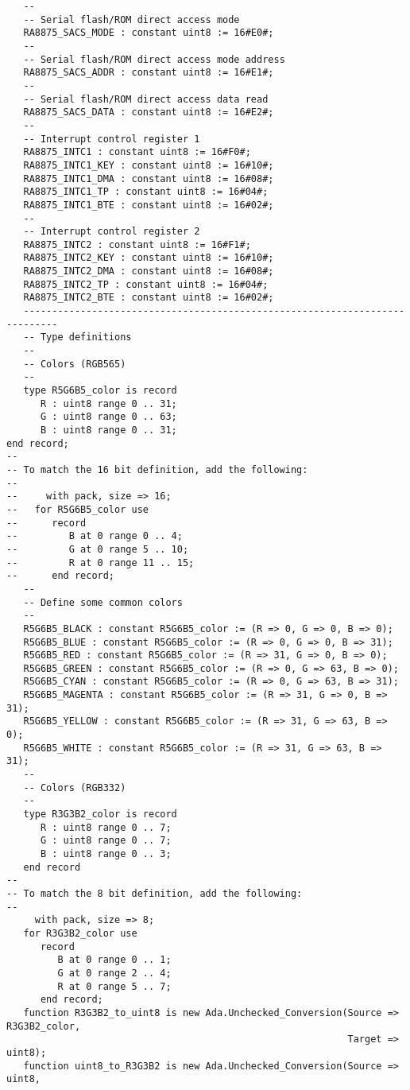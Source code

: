\documentclass[10pt, openany]{book}
\begin{document}
\begin{lstlisting}
   --
   -- Serial flash/ROM direct access mode
   RA8875_SACS_MODE : constant uint8 := 16#E0#;
   --
   -- Serial flash/ROM direct access mode address
   RA8875_SACS_ADDR : constant uint8 := 16#E1#;
   --
   -- Serial flash/ROM direct access data read
   RA8875_SACS_DATA : constant uint8 := 16#E2#;
   --
   -- Interrupt control register 1
   RA8875_INTC1 : constant uint8 := 16#F0#;
   RA8875_INTC1_KEY : constant uint8 := 16#10#;
   RA8875_INTC1_DMA : constant uint8 := 16#08#;
   RA8875_INTC1_TP : constant uint8 := 16#04#;
   RA8875_INTC1_BTE : constant uint8 := 16#02#;
   --
   -- Interrupt control register 2
   RA8875_INTC2 : constant uint8 := 16#F1#;
   RA8875_INTC2_KEY : constant uint8 := 16#10#;
   RA8875_INTC2_DMA : constant uint8 := 16#08#;
   RA8875_INTC2_TP : constant uint8 := 16#04#;
   RA8875_INTC2_BTE : constant uint8 := 16#02#;
   ----------------------------------------------------------------------------
   -- Type definitions
   --
   -- Colors (RGB565)
   --
   type R5G6B5_color is record
      R : uint8 range 0 .. 31;
      G : uint8 range 0 .. 63;
      B : uint8 range 0 .. 31;
end record;
--
-- To match the 16 bit definition, add the following:
--
--     with pack, size => 16;
--   for R5G6B5_color use
--      record
--         B at 0 range 0 .. 4;
--         G at 0 range 5 .. 10;
--         R at 0 range 11 .. 15;
--      end record;
   --
   -- Define some common colors
   --
   R5G6B5_BLACK : constant R5G6B5_color := (R => 0, G => 0, B => 0);
   R5G6B5_BLUE : constant R5G6B5_color := (R => 0, G => 0, B => 31);
   R5G6B5_RED : constant R5G6B5_color := (R => 31, G => 0, B => 0);
   R5G6B5_GREEN : constant R5G6B5_color := (R => 0, G => 63, B => 0);
   R5G6B5_CYAN : constant R5G6B5_color := (R => 0, G => 63, B => 31);
   R5G6B5_MAGENTA : constant R5G6B5_color := (R => 31, G => 0, B => 31);
   R5G6B5_YELLOW : constant R5G6B5_color := (R => 31, G => 63, B => 0);
   R5G6B5_WHITE : constant R5G6B5_color := (R => 31, G => 63, B => 31);
   --
   -- Colors (RGB332)
   --
   type R3G3B2_color is record
      R : uint8 range 0 .. 7;
      G : uint8 range 0 .. 7;
      B : uint8 range 0 .. 3;
   end record
--
-- To match the 8 bit definition, add the following:
--
     with pack, size => 8;
   for R3G3B2_color use
      record
         B at 0 range 0 .. 1;
         G at 0 range 2 .. 4;
         R at 0 range 5 .. 7;
      end record;
   function R3G3B2_to_uint8 is new Ada.Unchecked_Conversion(Source => R3G3B2_color,
                                                            Target => uint8);
   function uint8_to_R3G3B2 is new Ada.Unchecked_Conversion(Source => uint8,

\end{lstlisting}
\end{document}
